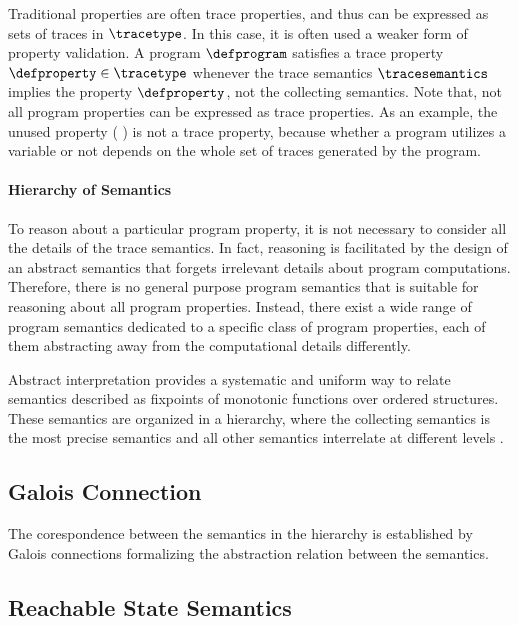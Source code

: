 Traditional properties are often trace properties, and thus can be expressed as sets of traces in $\tracetype$. In this case, it is often used a weaker form of property validation. A program $\defprogram$ satisfies a trace property $\defproperty\in\tracetype$ whenever the trace semantics $\tracesemantics$ implies the property $\defproperty$, not the collecting semantics. Note that, not all program properties can be expressed as trace properties. As an example, the unused property  (\cf{} ) is not a trace property, because whether a program utilizes a variable or not depends on the whole set of traces generated by the program.

\paragraph{Hierarchy of Semantics}

To reason about a particular program property, it is not necessary to consider all the details of the trace semantics.
In fact, reasoning is facilitated by the design of an abstract semantics that forgets irrelevant details about program computations.
Therefore, there is no general purpose program semantics that is suitable for reasoning about all program properties.
Instead, there exist a wide range of program semantics dedicated to a specific class of program properties, each of them abstracting away from the computational details differently.

Abstract interpretation provides a systematic and uniform way to relate semantics described as fixpoints of monotonic functions over ordered structures.
These semantics are organized in a hierarchy, where the collecting semantics is the most precise semantics and all other semantics interrelate at different levels .


\subsection{Galois Connection}

The corespondence between the semantics in the hierarchy is established by Galois connections formalizing the abstraction relation between the semantics.


\subsection{Reachable State Semantics}

